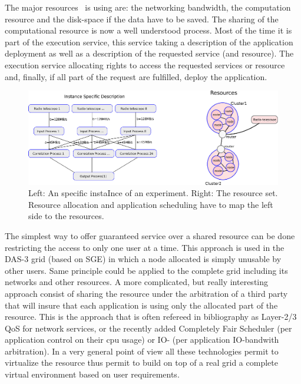The major resources \scarie\ is using are: the networking bandwidth, 
the computation resource and the disk-space if the data have 
to be saved. The sharing of the computational resource is now
a well understood process. Most of the time it is part of the 
execution service, this service taking a description of the 
application deployment as well as a description of the 
requested service (and resource). The execution service 
allocating rights to access the requested services or 
resource and, finally, if all part of the request 
are fulfilled, deploy the application. 
\begin{figure}
  \centering
  \includegraphics[width=\textwidth]
    {img/mapping.eps}
    \caption{Left: An specific instaInce of an experiment. Right: The
      resource set. Resource allocation and application scheduling
      have to map the left side to the resources. }
  \label{fig:mapping}
\end{figure}
The simplest way to offer guaranteed service over a shared resource
can be done restricting the access to only one user at a time. This
approach is used in the DAS-3 grid (based on SGE) in which a node
allocated is simply unusable by other users. Same principle could be
applied to the complete grid including its networks and other
resources. A more complicated, but really interesting approach consist
of sharing the resource under the arbitration of a third party that
will insure that each application is using only the allocated part of
the resource. This is the approach that is often refereed in
bibliography as Layer-2/3 QoS for network services, or the recently
added Completely Fair Scheduler (per application control on their cpu
usage) or IO- (per application IO-bandwith arbitration). In a very
general point of view all these technologies permit to virtualize the
resource thus permit to build on top of a real grid a complete virtual
environment based on user requirements.


